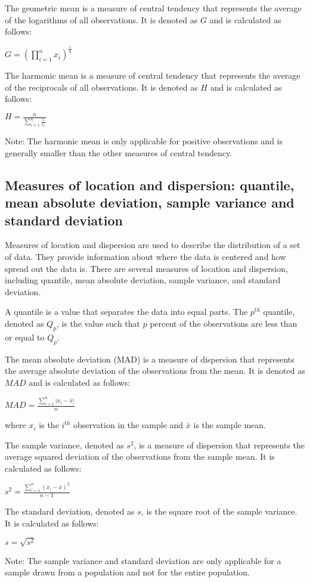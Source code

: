 \documentclass[12pt, a4paper, oneside]{article}
\begin{document}
The geometric mean is a measure of central tendency that represents the average of the logarithms of all observations. It is denoted as $G$ and is calculated as follows:

$G = (\prod_{i=1}^{n}x_i)^{\frac{1}{n}}$

The harmonic mean is a measure of central tendency that represents the average of the reciprocals of all observations. It is denoted as $H$ and is calculated as follows:

$H = \frac{n}{\sum_{i=1}^{n}\frac{1}{x_i}}$

Note: The harmonic mean is only applicable for positive observations and is generally smaller than the other measures of central tendency.
\subsection{ Measures of location and dispersion: quantile, mean absolute deviation, sample variance and standard deviation }
Measures of location and dispersion are used to describe the distribution of a set of data. They provide information about where the data is centered and how spread out the data is. There are several measures of location and dispersion, including quantile, mean absolute deviation, sample variance, and standard deviation.

A quantile is a value that separates the data into equal parts. The $p^{th}$ quantile, denoted as $Q_p$, is the value such that $p$ percent of the observations are less than or equal to $Q_p$.

The mean absolute deviation (MAD) is a measure of dispersion that represents the average absolute deviation of the observations from the mean. It is denoted as $MAD$ and is calculated as follows:

$MAD = \frac{\sum_{i=1}^{n}|x_i - \bar{x}|}{n}$

where $x_i$ is the $i^{th}$ observation in the sample and $\bar{x}$ is the sample mean.

The sample variance, denoted as $s^2$, is a measure of dispersion that represents the average squared deviation of the observations from the sample mean. It is calculated as follows:

$s^2 = \frac{\sum_{i=1}^{n}(x_i - \bar{x})^2}{n-1}$

The standard deviation, denoted as $s$, is the square root of the sample variance. It is calculated as follows:

$s = \sqrt{s^2}$

Note: The sample variance and standard deviation are only applicable for a sample drawn from a population and not for the entire population.
\end{document}
